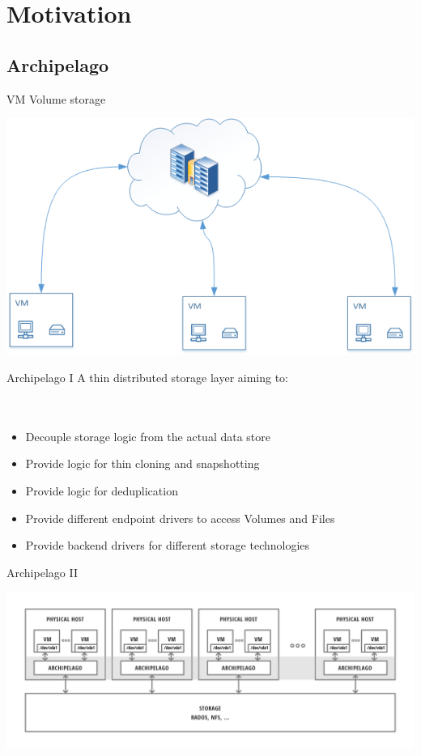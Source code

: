 \section{Motivation}

\subsection{Archipelago}
\begin{frame}{VM Volume storage}
\begin{center}
    \includegraphics[scale=0.5]{images/cloud-storage.png} \\
\end{center}
\end{frame}

\begin{frame}{Archipelago I}
A thin distributed storage layer aiming to:
\hfill \\
\hfill \\
\hfill \\
\begin{itemize}
\item Decouple storage logic from the actual data store
\item Provide logic for thin cloning and snapshotting
\item Provide logic for deduplication
\item Provide different endpoint drivers to access Volumes and Files
\item Provide backend drivers for different storage technologies
\end{itemize}
\end{frame}

\begin{frame}{Archipelago II}
\begin{center}
    \includegraphics[scale=0.4]{images/archipelago-overview.png} \\
\end{center}
\end{frame}


